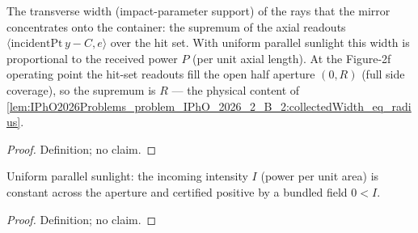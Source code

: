 
\begin{definition}
\label{def:IPhO2026Problems_problem_IPhO_2026_2_B_2:collectedWidth}
The transverse width (impact-parameter support) of the rays that the mirror
concentrates onto the container: the supremum of the axial readouts
$\langle \mathrm{incidentPt}\,y - C, e\rangle$ over the hit set.  With
uniform parallel sunlight this width is proportional to the received power
$P$ (per unit axial length).  At the Figure-2f operating point the
hit-set readouts fill the open half aperture $(0, R)$ (full side
coverage), so the supremum is $R$ --- the physical content of
\cref{lem:IPhO2026Problems_problem_IPhO_2026_2_B_2:collectedWidth_eq_radius}.
\end{definition}
\begin{proof}
Definition; no claim.
\end{proof}

\begin{definition}
\label{def:IPhO2026Problems_problem_IPhO_2026_2_B_2:UniformIntensity}
Uniform parallel sunlight: the incoming intensity $I$ (power per unit area)
is constant across the aperture and certified positive by a bundled field
$0 < I$.
\end{definition}
\begin{proof}
Definition; no claim.
\end{proof}

